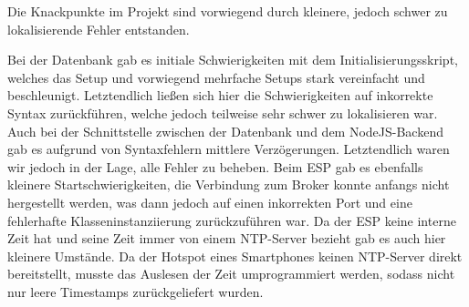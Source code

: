Die Knackpunkte im Projekt sind vorwiegend durch kleinere, jedoch schwer zu lokalisierende Fehler entstanden. \newline

Bei der Datenbank gab es initiale Schwierigkeiten mit dem Initialisierungsskript, welches das Setup und vorwiegend mehrfache Setups stark vereinfacht und beschleunigt.
Letztendlich ließen sich hier die Schwierigkeiten auf inkorrekte Syntax zurückführen, welche jedoch teilweise sehr schwer zu lokalisieren war. \newline
Auch bei der Schnittstelle zwischen der Datenbank und dem NodeJS-Backend gab es aufgrund von Syntaxfehlern mittlere Verzögerungen.
Letztendlich waren wir jedoch in der Lage, alle Fehler zu beheben. \newline
Beim ESP gab es ebenfalls kleinere Startschwierigkeiten, die Verbindung zum Broker konnte anfangs nicht hergestellt werden, was dann jedoch auf einen inkorrekten Port und eine fehlerhafte Klasseninstanziierung zurückzuführen war.
Da der ESP keine interne Zeit hat und seine Zeit immer von einem NTP-Server bezieht gab es auch hier kleinere Umstände.
Da der Hotspot eines Smartphones keinen NTP-Server direkt bereitstellt, musste das Auslesen der Zeit umprogrammiert werden, sodass nicht nur leere Timestamps zurückgeliefert wurden.